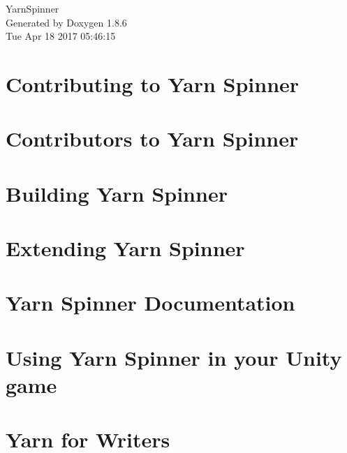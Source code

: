 \documentclass[twoside]{book}
\newcommand{\clearemptydoublepage}{%
  \newpage{\pagestyle{empty}\cleardoublepage}%
}
\begin{document}
\hypersetup{pageanchor=false}
\begin{titlepage}
\vspace*{7cm}
\begin{center}%
{\Large Yarn\-Spinner }\\
\vspace*{1cm}
{\large Generated by Doxygen 1.8.6}\\
\vspace*{0.5cm}
{\small Tue Apr 18 2017 05:46:15}\\
\end{center}
\end{titlepage}
\clearemptydoublepage
\tableofcontents
\clearemptydoublepage
{}
\hypersetup{pageanchor=true}

\chapter{Contributing to Yarn Spinner}
\label{d7/d46/a00002}
\hypertarget{d7/d46/a00002}{}

\chapter{Contributors to Yarn Spinner}
\label{d0/d0b/a00004}
\hypertarget{d0/d0b/a00004}{}

\chapter{Building Yarn Spinner}
\label{de/d21/a00006}
\hypertarget{de/d21/a00006}{}

\chapter{Extending Yarn Spinner}
\label{d4/dee/a00008}
\hypertarget{d4/dee/a00008}{}

\chapter{Yarn Spinner Documentation}
\label{d7/dec/a00010}
\hypertarget{d7/dec/a00010}{}

\chapter{Using Yarn Spinner in your Unity game}
\label{df/d86/a00012}
\hypertarget{df/d86/a00012}{}

\chapter{Yarn for Writers}
\label{d2/de7/a00014}
\hypertarget{d2/de7/a00014}{}

\end{document}
